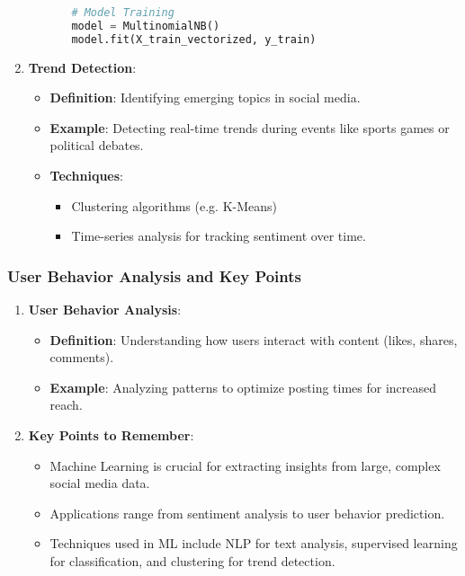 \documentclass{beamer}
\begin{document}
\begin{frame}[fragile]
\begin{enumerate}
\begin{itemize}
\begin{itemize}
\begin{lstlisting}[language=Python]
# Model Training
model = MultinomialNB()
model.fit(X_train_vectorized, y_train)
                        \end{lstlisting}
                    \end{itemize}
            \end{itemize}

        \item \textbf{Trend Detection}:
            \begin{itemize}
                \item \textbf{Definition}: Identifying emerging topics in social media.
                \item \textbf{Example}: Detecting real-time trends during events like sports games or political debates.
                \item \textbf{Techniques}: 
                    \begin{itemize}
                        \item Clustering algorithms (e.g. K-Means)
                        \item Time-series analysis for tracking sentiment over time.
                    \end{itemize}
            \end{itemize}
    \end{enumerate}
\end{frame}

\begin{frame}[fragile]
    \frametitle{User Behavior Analysis and Key Points}
    \begin{enumerate}
        \item \textbf{User Behavior Analysis}:
            \begin{itemize}
                \item \textbf{Definition}: Understanding how users interact with content (likes, shares, comments).
                \item \textbf{Example}: Analyzing patterns to optimize posting times for increased reach.
            \end{itemize}
        
        \item \textbf{Key Points to Remember}:
            \begin{itemize}
                \item Machine Learning is crucial for extracting insights from large, complex social media data.
                \item Applications range from sentiment analysis to user behavior prediction.
                \item Techniques used in ML include NLP for text analysis, supervised learning for classification, and clustering for trend detection.
            \end{itemize}
    \end{enumerate}
\end{frame}
\end{document}
